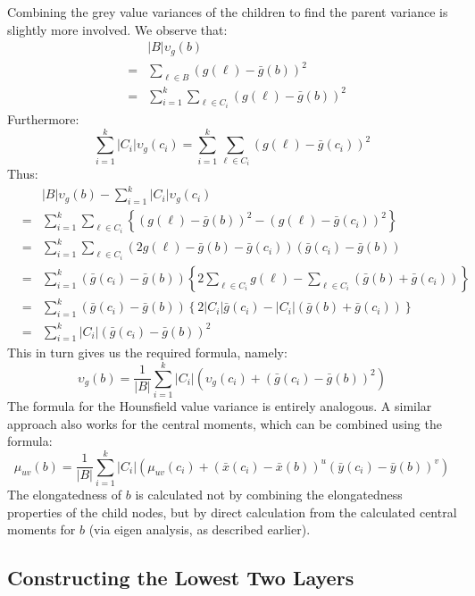 \noindent Combining the grey value variances of the children to find the parent variance is slightly more involved. We observe that:
%
\begin{eqnarray*}
&   & |B|\upsilon_g(b) \\
& = & \sum_{\ell \in B} (g(\ell) - \bar{g}(b))^2 \\
& = & \sum_{i=1}^k \sum_{\ell \in C_i} (g(\ell) - \bar{g}(b))^2
\end{eqnarray*}
%
\noindent Furthermore:
%
\[
\sum_{i=1}^k |C_i|\upsilon_g(c_i) = \sum_{i=1}^k \sum_{\ell \in C_i} (g(\ell) - \bar{g}(c_i))^2
\]
%
\noindent Thus:
%
\begin{eqnarray*}
&   & |B|\upsilon_g(b) - \sum_{i=1}^k |C_i|\upsilon_g(c_i) \\
%
& = & \sum_{i=1}^k \sum_{\ell \in C_i} \left\{ (g(\ell) - \bar{g}(b))^2 - (g(\ell) - \bar{g}(c_i))^2 \right\} \\
%
& = & \sum_{i=1}^k \sum_{\ell \in C_i} (2g(\ell) - \bar{g}(b) - \bar{g}(c_i))(\bar{g}(c_i) - \bar{g}(b)) \\
%
& = & \sum_{i=1}^k (\bar{g}(c_i) - \bar{g}(b)) \left\{ 2 \sum_{\ell \in C_i} g(\ell) - \sum_{\ell \in C_i} (\bar{g}(b) + \bar{g}(c_i)) \right\} \\
%
& = & \sum_{i=1}^k (\bar{g}(c_i) - \bar{g}(b)) \left\{ 2|C_i|\bar{g}(c_i) - |C_i|(\bar{g}(b) + \bar{g}(c_i)) \right\} \\
%
& = & \sum_{i=1}^k |C_i|(\bar{g}(c_i) - \bar{g}(b))^2
\end{eqnarray*}
%
\noindent This in turn gives us the required formula, namely:
%
\[
\upsilon_g(b) = \frac{1}{|B|} \sum_{i=1}^k |C_i| (\upsilon_g(c_i) + (\bar{g}(c_i) - \bar{g}(b))^2)
\]
%
\noindent The formula for the Hounsfield value variance is entirely analogous. A similar approach also works for the central moments, which can be combined using the formula:
%
\[
\mu_{uv}(b) = \frac{1}{|B|} \sum_{i=1}^k |C_i| (\mu_{uv}(c_i) + (\bar{x}(c_i) - \bar{x}(b))^u (\bar{y}(c_i) - \bar{y}(b))^v)
\]
%
\noindent The elongatedness of $b$ is calculated not by combining the elongatedness properties of the child nodes, but by direct calculation from the calculated central moments for $b$ (via eigen analysis, as described earlier).

\subsection{Constructing the Lowest Two Layers}

